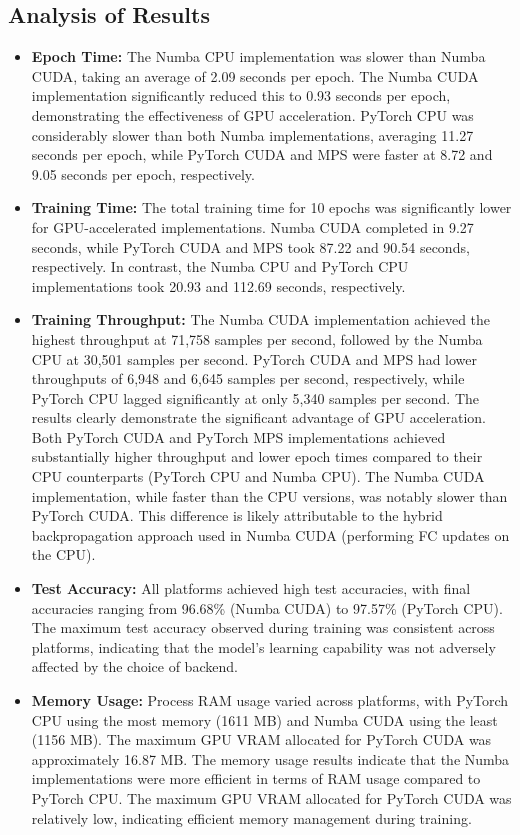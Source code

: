 \documentclass[conference]{IEEEtran} %
\begin{document}
\subsection*{Analysis of Results} %
\begin{itemize}
    \item \textbf{Epoch Time:} The Numba CPU implementation was slower than Numba CUDA, taking an average of 2.09 seconds per epoch. The Numba CUDA implementation significantly reduced this to 0.93 seconds per epoch, demonstrating the effectiveness of GPU acceleration. PyTorch CPU was considerably slower than both Numba implementations, averaging 11.27 seconds per epoch, while PyTorch CUDA and MPS were faster at 8.72 and 9.05 seconds per epoch, respectively.
    \item \textbf{Training Time:} The total training time for 10 epochs was significantly lower for GPU-accelerated implementations. Numba CUDA completed in 9.27 seconds, while PyTorch CUDA and MPS took 87.22 and 90.54 seconds, respectively. In contrast, the Numba CPU and PyTorch CPU implementations took 20.93 and 112.69 seconds, respectively.
    \item \textbf{Training Throughput:} The Numba CUDA implementation achieved the highest throughput at 71,758 samples per second, followed by the Numba CPU at 30,501 samples per second. PyTorch CUDA and MPS had lower throughputs of 6,948 and 6,645 samples per second, respectively, while PyTorch CPU lagged significantly at only 5,340 samples per second. The results clearly demonstrate the significant advantage of GPU acceleration. Both PyTorch CUDA and PyTorch MPS implementations achieved substantially higher throughput and lower epoch times compared to their CPU counterparts (PyTorch CPU and Numba CPU). The Numba CUDA implementation, while faster than the CPU versions, was notably slower than PyTorch CUDA. This difference is likely attributable to the hybrid backpropagation approach used in Numba CUDA (performing FC updates on the CPU).
    \item \textbf{Test Accuracy:} All platforms achieved high test accuracies, with final accuracies ranging from 96.68\% (Numba CUDA) to 97.57\% (PyTorch CPU). The maximum test accuracy observed during training was consistent across platforms, indicating that the model's learning capability was not adversely affected by the choice of backend.
    \item \textbf{Memory Usage:} Process RAM usage varied across platforms, with PyTorch CPU using the most memory (1611 MB) and Numba CUDA using the least (1156 MB). The maximum GPU VRAM allocated for PyTorch CUDA was approximately 16.87 MB. The memory usage results indicate that the Numba implementations were more efficient in terms of RAM usage compared to PyTorch CPU. The maximum GPU VRAM allocated for PyTorch CUDA was relatively low, indicating efficient memory management during training.
\end{itemize}
\end{document}
